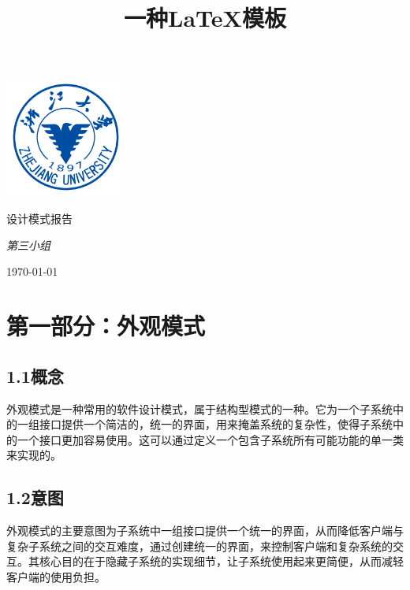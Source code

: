 \documentclass[24pt,a4paper]{article}%
\title{\fontsize{18pt}{27pt}\selectfont%
	{\heiti%
		一种\LaTeX 模板}}%
\date{}%
\begin{document}
\begin{titlepage}
    \centering
    \includegraphics[width=0.3\textwidth]{image/zju_logo.png}\par\vspace{5cm}
    {\huge\songti 设计模式报告\par}
    \vspace{1cm}
    {\Large\itshape 第三小组\par}
    \vspace{7cm}

    \vfill
    {\large \today\par}
\end{titlepage}
\newpage

\begin{center}
    \kaishu
    \tableofcontents
    \setcounter{page}{0}
    \thispagestyle{empty} %
\end{center}
\newpage

\section*{\songti 第一部分：外观模式}
\subsection*{\songti 1.1概念}
外观模式是一种常用的软件设计模式，属于结构型模式的一种。它为一个子系统中的一组接口提供一个简洁的，统一的界面，用来掩盖系统的复杂性，使得子系统中的一个接口更加容易使用。这可以通过定义一个包含子系统所有可能功能的单一类来实现的。
\subsection*{\songti 1.2意图}
外观模式的主要意图为子系统中一组接口提供一个统一的界面，从而降低客户端与复杂子系统之间的交互难度，通过创建统一的界面，来控制客户端和复杂系统的交互。其核心目的在于隐藏子系统的实现细节，让子系统使用起来更简便，从而减轻客户端的使用负担。
\end{document}
